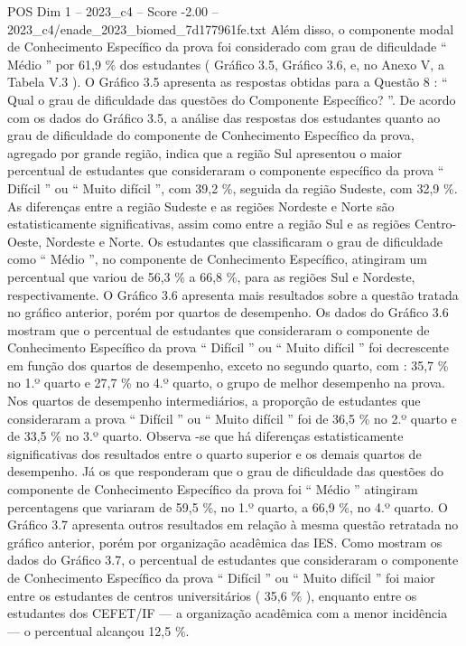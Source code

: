 \begin{textsample}{POS Dim 1 – 2023\_c4 – Score -2.00 – 2023\_c4/enade\_2023\_biomed\_7d177961fe.txt}
Além disso, o componente modal de Conhecimento Específico da prova foi considerado com grau de dificuldade “ Médio ” por 61,9 \% dos estudantes ( Gráfico 3.5, Gráfico 3.6, e, no Anexo V, a Tabela V.3 ).
O Gráfico 3.5 apresenta as respostas obtidas para a Questão 8 : “ Qual o grau de dificuldade das questões do Componente Específico? ”.
De acordo com os dados do Gráfico 3.5, a análise das respostas dos estudantes quanto ao grau de dificuldade do componente de Conhecimento Específico da prova, agregado por grande região, indica que a região Sul apresentou o maior percentual de estudantes que consideraram o componente específico da prova “ Difícil ” ou “ Muito difícil ”, com 39,2 \%, seguida da região Sudeste, com 32,9 \%.
As diferenças entre a região Sudeste e as regiões Nordeste e Norte são estatisticamente significativas, assim como entre a região Sul e as regiões Centro-Oeste, Nordeste e Norte.
Os estudantes que classificaram o grau de dificuldade como “ Médio ”, no componente de Conhecimento Específico, atingiram um percentual que variou de 56,3 \% a 66,8 \%, para as regiões Sul e Nordeste, respectivamente.
O Gráfico 3.6 apresenta mais resultados sobre a questão tratada no gráfico anterior, porém por quartos de desempenho.
Os dados do Gráfico 3.6 mostram que o percentual de estudantes que consideraram o componente de Conhecimento Específico da prova “ Difícil ” ou “ Muito difícil ” foi decrescente em função dos quartos de desempenho, exceto no segundo quarto, com : 35,7 \% no 1.º quarto e 27,7 \% no 4.º quarto, o grupo de melhor desempenho na prova.
Nos quartos de desempenho intermediários, a proporção de estudantes que consideraram a prova “ Difícil ” ou “ Muito difícil ” foi de 36,5 \% no 2.º quarto e de 33,5 \% no 3.º quarto.
Observa -se que há diferenças estatisticamente significativas dos resultados entre o quarto superior e os demais quartos de desempenho.
Já os que responderam que o grau de dificuldade das questões do componente de Conhecimento Específico da prova foi “ Médio ” atingiram percentagens que variaram de 59,5 \%, no 1.º quarto, a 66,9 \%, no 4.º quarto.
O Gráfico 3.7 apresenta outros resultados em relação à mesma questão retratada no gráfico anterior, porém por organização acadêmica das IES.
Como mostram os dados do Gráfico 3.7, o percentual de estudantes que consideraram o componente de Conhecimento Específico da prova “ Difícil ” ou “ Muito difícil ” foi maior entre os estudantes de centros universitários ( 35,6 \% ), enquanto entre os estudantes dos CEFET/IF — a organização acadêmica com a menor incidência — o percentual alcançou 12,5 \%.

\end{textsample}
